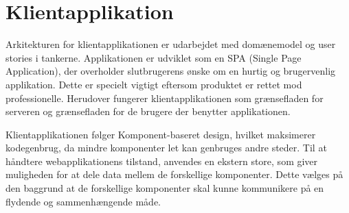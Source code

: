 \section{Klientapplikation}

Arkitekturen for klientapplikationen er udarbejdet med domænemodel og user stories i tankerne. Applikationen er udviklet som en SPA (Single Page Application), der overholder slutbrugerens ønske om en hurtig og brugervenlig applikation. Dette er specielt vigtigt eftersom produktet er rettet mod professionelle. Herudover fungerer klientapplikationen som grænsefladen for serveren og grænsefladen for de brugere der benytter applikationen.

Klientapplikationen følger Komponent-baseret design, hvilket maksimerer kodegenbrug, da mindre komponenter let kan genbruges andre steder. Til at håndtere webapplikationens tilstand, anvendes en ekstern store, som giver muligheden for at dele data mellem de forskellige komponenter. Dette vælges på den baggrund at de forskellige komponenter skal kunne kommunikere på en flydende og sammenhængende måde.


